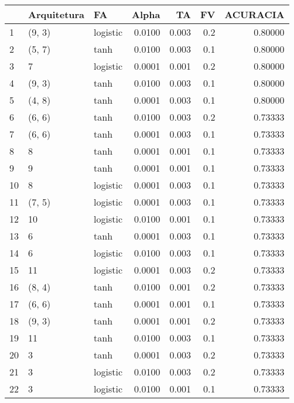 \begin{tabular}{lllrrrr}
\toprule
{} & Arquitetura &        FA &   Alpha &     TA &   FV &  ACURACIA \\
\midrule
1   &      (9, 3) &  logistic &  0.0100 &  0.003 &  0.2 &   0.80000 \\
2   &      (5, 7) &      tanh &  0.0100 &  0.003 &  0.1 &   0.80000 \\
3   &           7 &  logistic &  0.0001 &  0.001 &  0.2 &   0.80000 \\
4   &      (9, 3) &      tanh &  0.0100 &  0.003 &  0.1 &   0.80000 \\
5   &      (4, 8) &      tanh &  0.0001 &  0.003 &  0.1 &   0.80000 \\
6   &      (6, 6) &      tanh &  0.0100 &  0.003 &  0.2 &   0.73333 \\
7   &      (6, 6) &      tanh &  0.0001 &  0.003 &  0.1 &   0.73333 \\
8   &           8 &      tanh &  0.0001 &  0.001 &  0.1 &   0.73333 \\
9   &           9 &      tanh &  0.0001 &  0.001 &  0.1 &   0.73333 \\
10  &           8 &  logistic &  0.0001 &  0.003 &  0.1 &   0.73333 \\
11  &      (7, 5) &  logistic &  0.0001 &  0.003 &  0.1 &   0.73333 \\
12  &          10 &  logistic &  0.0100 &  0.001 &  0.1 &   0.73333 \\
13  &           6 &      tanh &  0.0001 &  0.003 &  0.1 &   0.73333 \\
14  &           6 &  logistic &  0.0100 &  0.003 &  0.1 &   0.73333 \\
15  &          11 &  logistic &  0.0001 &  0.003 &  0.2 &   0.73333 \\
16  &      (8, 4) &      tanh &  0.0100 &  0.001 &  0.2 &   0.73333 \\
17  &      (6, 6) &      tanh &  0.0001 &  0.001 &  0.1 &   0.73333 \\
18  &      (9, 3) &      tanh &  0.0001 &  0.001 &  0.2 &   0.73333 \\
19  &          11 &      tanh &  0.0100 &  0.003 &  0.1 &   0.73333 \\
20  &           3 &      tanh &  0.0001 &  0.003 &  0.2 &   0.73333 \\
21  &           3 &  logistic &  0.0100 &  0.003 &  0.2 &   0.73333 \\
22  &           3 &  logistic &  0.0100 &  0.001 &  0.1 &   0.73333 \\

\end{tabular}
